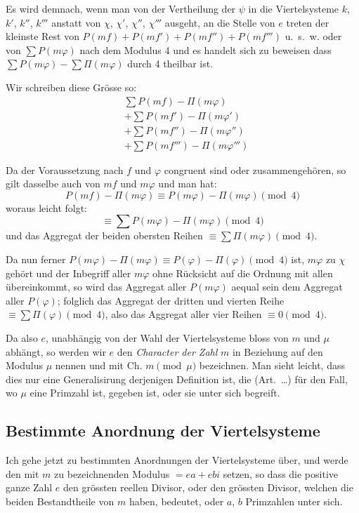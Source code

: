\documentclass[12pt,a4paper]{article}
\begin{document}
Es wird demnach, wenn man von der Vertheilung der $\psi$ in die Viertelsysteme $k$, $k'$, $k''$, $k'''$ anstatt von $\chi$, $\chi'$, $\chi''$, $\chi'''$ ausgeht, an die Stelle von $e$ treten der kleinste Rest von $P(mf) + P(mf') + P(mf'') + P(mf''')$ u.~s.~w. oder von $\sum P(m\varphi)$ nach dem Modulus 4 und es handelt sich zu beweisen dass $\sum P(m\varphi) - \sum \Pi(m\varphi)$ durch 4 theilbar ist.

Wir schreiben diese Grösse so:
\begin{align*}
&\sum P(mf) - \Pi(m\varphi)\\
&+ \sum P(mf') - \Pi(m\varphi')\\
&+ \sum P(mf'') - \Pi(m\varphi'')\\
&+ \sum P(mf''') - \Pi(m\varphi''')
\end{align*}

Da der Voraussetzung nach $f$ und $\varphi$ congruent sind oder zusammengehören, so gilt dasselbe auch von $mf$ und $m\varphi$ und man hat:
\[
P(mf) - \Pi(m\varphi) \equiv P(m\varphi) - \Pi(m\varphi) \pmod{4}
\]
woraus leicht folgt:
\[
\equiv \sum P(m\varphi) - \Pi(m\varphi) \pmod{4}
\]
und das Aggregat der beiden obersten Reihen $\equiv \sum \Pi(m\varphi) \pmod{4}$. 

Da nun ferner $P(m\varphi) - \Pi(m\varphi) \equiv P(\varphi) - \Pi(\varphi) \pmod{4}$ ist, $m\varphi$ zu $\chi$ gehört und der Inbegriff aller $m\varphi$ ohne Rücksicht auf die Ordnung mit allen übereinkommt, so wird das Aggregat aller $P(m\varphi)$ aequal sein dem Aggregat aller $P(\varphi)$; folglich das Aggregat der dritten und vierten Reihe $\equiv \sum \Pi(\varphi) \pmod{4}$, also das Aggregat aller vier Reihen $\equiv 0 \pmod{4}$.

Da also $e$, unabhängig von der Wahl der Viertelsysteme bloss von $m$ und $\mu$ abhängt, so werden wir $e$ den \emph{Character der Zahl} $m$ in Beziehung auf den Modulus $\mu$ nennen und mit $\text{Ch. } m \pmod{\mu}$ bezeichnen. Man sieht leicht, dass dies nur eine Generalisirung derjenigen Definition ist, die (Art.~\ldots) für den Fall, wo $\mu$ eine Primzahl ist, gegeben ist, oder sie unter sich begreift.

\subsection*{Bestimmte Anordnung der Viertelsysteme}

Ich gehe jetzt zu bestimmten Anordnungen der Viertelsysteme über, und werde den mit $m$ zu bezeichnenden Modulus $= ea + ebi$ setzen, so dass die positive ganze Zahl $e$ den grössten reellen Divisor, oder den grössten Divisor, welchen die beiden Bestandtheile von $m$ haben, bedeutet, oder $a$, $b$ Primzahlen unter sich.
\end{document}
